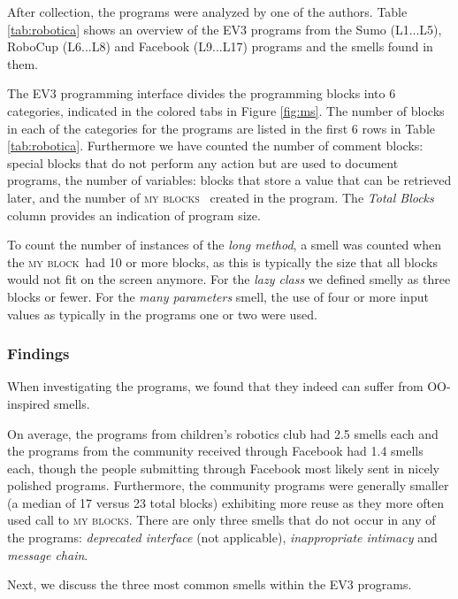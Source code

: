 \documentclass{sig-alternate}
\newcommand{\mbs}{\textsc{my blocks}}
\newcommand{\mb}{\textsc{my block}}
\begin{document}
After collection, the programs were analyzed by one of the authors. Table \ref{tab:robotica} shows an overview of the EV3 programs from the Sumo (L1...L5), RoboCup (L6...L8) and Facebook (L9...L17) programs and the smells found in them. 

The EV3 programming interface divides the programming blocks into 6 categories, indicated in the colored tabs in Figure \ref{fig:ms}. The number of blocks in each of the categories for the programs are listed in the first 6 rows in Table \ref{tab:robotica}. Furthermore we have counted the number of comment blocks: special blocks that do not perform any action but are used to document programs, the number of variables: blocks that store a value that can be retrieved later, and the number of \mbs~ created in the program. The \emph{Total Blocks} column provides an indication of program size.  

To count the number of instances of the \emph{long method}, a smell was counted when the \mb~had 10 or more blocks, as this is typically the size that all blocks would not fit on the screen anymore. For the \emph{lazy class} we defined smelly as three blocks or fewer. For the  \emph{many parameters} smell, the use of four or more input values as typically in the programs one or two were used.

\subsubsection{Findings}
When investigating the programs, we found that they indeed can suffer from OO-inspired smells. 

On average, the programs from children's robotics club had 2.5 smells each and the programs from the community received through Facebook had 1.4 smells each, though  the people submitting through Facebook most likely sent in nicely polished programs. Furthermore, the community programs were generally smaller (a median of 17 versus 23 total blocks) exhibiting more reuse as they more often used call to \mbs. There are only three smells that do not occur in any of the programs: \emph{deprecated interface} (not applicable), \emph{inappropriate intimacy} and \emph{message chain}.

Next, we discuss the three most common smells within the EV3 programs. 

\end{document}
